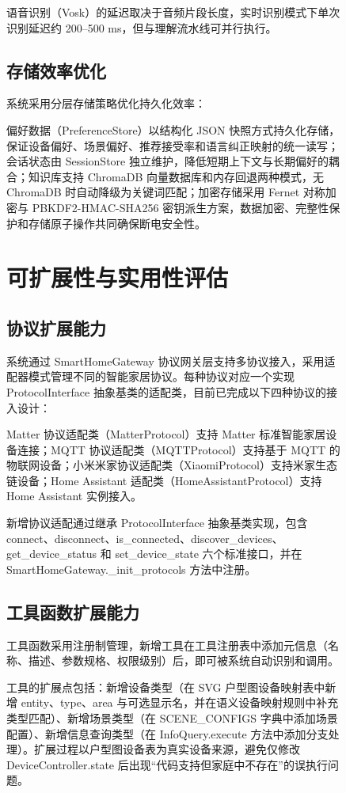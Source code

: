 \documentclass[12pt,a4paper,oneside]{ctexrep}
\begin{document}
\begin{figure}[H]
语音识别（Vosk）的延迟取决于音频片段长度，实时识别模式下单次识别延迟约 200--500 ms，但与理解流水线可并行执行。

\section{存储效率优化}

系统采用分层存储策略优化持久化效率：

偏好数据（PreferenceStore）以结构化 JSON 快照方式持久化存储，保证设备偏好、场景偏好、推荐接受率和语言纠正映射的统一读写；会话状态由 SessionStore 独立维护，降低短期上下文与长期偏好的耦合；知识库支持 ChromaDB 向量数据库和内存回退两种模式，无 ChromaDB 时自动降级为关键词匹配；加密存储采用 Fernet 对称加密与 PBKDF2-HMAC-SHA256 密钥派生方案，数据加密、完整性保护和存储原子操作共同确保断电安全性。

\chapter{可扩展性与实用性评估}

\section{协议扩展能力}

系统通过 SmartHomeGateway 协议网关层支持多协议接入，采用适配器模式管理不同的智能家居协议。每种协议对应一个实现 ProtocolInterface 抽象基类的适配类，目前已完成以下四种协议的接入设计：

Matter 协议适配类（MatterProtocol）支持 Matter 标准智能家居设备连接；MQTT 协议适配类（MQTTProtocol）支持基于 MQTT 的物联网设备；小米米家协议适配类（XiaomiProtocol）支持米家生态链设备；Home Assistant 适配类（HomeAssistantProtocol）支持 Home Assistant 实例接入。

新增协议适配通过继承 ProtocolInterface 抽象基类实现，包含 connect、disconnect、is\_connected、discover\_devices、get\_device\_status 和 set\_device\_state 六个标准接口，并在 SmartHomeGateway.\_init\_protocols 方法中注册。

\section{工具函数扩展能力}

工具函数采用注册制管理，新增工具在工具注册表中添加元信息（名称、描述、参数规格、权限级别）后，即可被系统自动识别和调用。

工具的扩展点包括：新增设备类型（在 SVG 户型图设备映射表中新增 entity、type、area 与可选显示名，并在语义设备映射规则中补充类型匹配）、新增场景类型（在 SCENE\_CONFIGS 字典中添加场景配置）、新增信息查询类型（在 InfoQuery.execute 方法中添加分支处理）。扩展过程以户型图设备表为真实设备来源，避免仅修改 DeviceController.state 后出现“代码支持但家庭中不存在”的误执行问题。


\end{figure}
\end{document}
